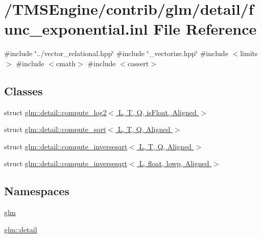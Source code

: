 \hypertarget{func__exponential_8inl}{}\section{/\+T\+M\+S\+Engine/contrib/glm/detail/func\+\_\+exponential.inl File Reference}
\label{func__exponential_8inl}
{\ttfamily \#include \char`\"{}../vector\+\_\+relational.\+hpp\char`\"{}}\newline
{\ttfamily \#include \char`\"{}\+\_\+vectorize.\+hpp\char`\"{}}\newline
{\ttfamily \#include $<$limits$>$}\newline
{\ttfamily \#include $<$cmath$>$}\newline
{\ttfamily \#include $<$cassert$>$}\newline
\subsection*{Classes}
\begin{DoxyCompactItemize}
\item 
struct \hyperlink{structglm_1_1detail_1_1compute__log2}{glm\+::detail\+::compute\+\_\+log2$<$ L, T, Q, is\+Float, Aligned $>$}
\item 
struct \hyperlink{structglm_1_1detail_1_1compute__sqrt}{glm\+::detail\+::compute\+\_\+sqrt$<$ L, T, Q, Aligned $>$}
\item 
struct \hyperlink{structglm_1_1detail_1_1compute__inversesqrt}{glm\+::detail\+::compute\+\_\+inversesqrt$<$ L, T, Q, Aligned $>$}
\item 
struct \hyperlink{structglm_1_1detail_1_1compute__inversesqrt_3_01_l_00_01float_00_01lowp_00_01_aligned_01_4}{glm\+::detail\+::compute\+\_\+inversesqrt$<$ L, float, lowp, Aligned $>$}
\end{DoxyCompactItemize}
\subsection*{Namespaces}
\begin{DoxyCompactItemize}
\item 
 \hyperlink{namespaceglm}{glm}
\item 
 \hyperlink{namespaceglm_1_1detail}{glm\+::detail}
\end{DoxyCompactItemize}
